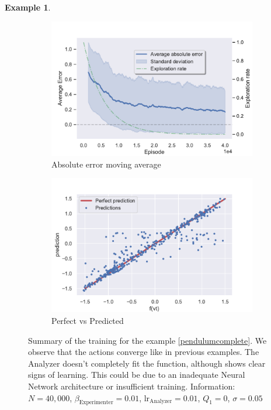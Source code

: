 \documentclass[11pt,a4paper,twoside]{report}
\newcommand{\+}{\textnormal{+} }
\theoremstyle{definition}
\newtheorem{myex}[mythm]{Example}
\numberwithin{equation}{chapter}
\begin{document}
\begin{myex}
\begin{figure}
      \bigskip  %
      \begin{subfigure}{0.45\textwidth}
      \includegraphics[width=\linewidth]{figures/Error-MAB5.pdf}
      \caption{Absolute error moving average}
      \end{subfigure}
      \hfill %
      \begin{subfigure}{0.45\textwidth}
      \includegraphics[width=\linewidth]{figures/predictions5.pdf}
      \caption{Perfect vs Predicted}
      \end{subfigure}
      \caption{Summary of the training for the example 
      \ref{pendulumcomplete}. We observe that the actions 
      converge like in previous examples. The Analyzer doesn't 
      completely fit the function, although shows clear signs of 
      learning. This could be due to an inadequate Neural Network
      architecture or insufficient training. Information: $N=40,000$,
      $\beta_\text{Experimenter}=0.01$, $\text{lr}_\text{Analyzer}=0.01$,
      $Q_1=0$, $\sigma=0.05$}
      \label{fig:completepd}
    \end{figure}
  \end{myex}
\end{document}

